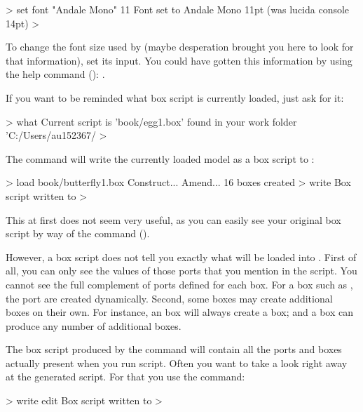 \begin{usdialog}
> set font "Andale Mono" 11
Font set to Andale Mono 11pt (was lucida console 14pt)
> 
\end{usdialog}

To change the font size used by  (maybe desperation brought you here to look for that information), set its  input. You could have gotten this information by using the help command (): .

If you want to be reminded what box script is currently loaded, just ask for it:
\begin{usdialog}
> what
Current script is 'book/egg1.box'
found in your work folder 'C:/Users/au152367/%
>\end{usdialog}

The  command will write the currently loaded model as a box script to \outputfolderexplained:

\begin{usdialog}
> load book/butterfly1.box
Construct...
Amend...
16 boxes created
> write
Box script written to %
>\end{usdialog}

This at first does not seem very useful, as you can easily see your original box script by way of the  command ().

However, a box script does not tell you exactly what will be loaded into \US. First of all, you can only see the values of those ports that you mention in the script. You cannot see the full complement of ports defined for each box. For a box such as , the port are created dynamically. Second, some boxes may create additional boxes on their own. For instance, an  box will always create a  box; and a  box can produce any number of additional boxes.

The box script produced by the  command will contain all the ports and boxes actually present when you run script. Often you want to take a look right away at the generated script. For that you use the  command:

\begin{usdialog}
> write edit
Box script written to %
> 
\end{usdialog}

